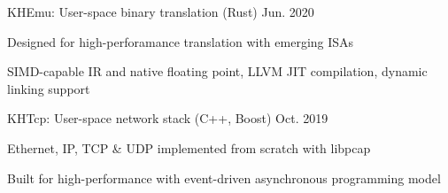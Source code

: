 

\begin{cventries}

  \cventry
    {KHEmu: User-space binary translation (Rust)}
    {}{}
    {Jun. 2020} %
    {
      \begin{cvitems} %
        \item {Designed for high-perforamance translation with emerging ISAs}
        \item {SIMD-capable IR and native floating point, LLVM JIT compilation, dynamic linking support}
      \end{cvitems}
    }

    \begin{comment}
  \cventry
    {RISC-V experiment platform on Zynq UltraScale+ MPSoC} %
    {}{}
    {Jan. 2020} %
    {
      \begin{cvitems} %
        \item {Based on Rocket Chip from UCB implemented on FPGA, tailored for computer architecture research}
        \item {High-speed debugging based on coherent memories and GPIO JTAG}
      \end{cvitems}
    }
    \end{comment}

  \cventry
    {KHTcp: User-space network stack (C++, Boost)} %
    {}{}
    {Oct. 2019} %
    {
        \begin{cvitems} %
        \item {Ethernet, IP, TCP \& UDP implemented from scratch with libpcap}
        \item {Built for high-performance with event-driven asynchronous programming model}
        \end{cvitems}
    }

\end{cventries}
